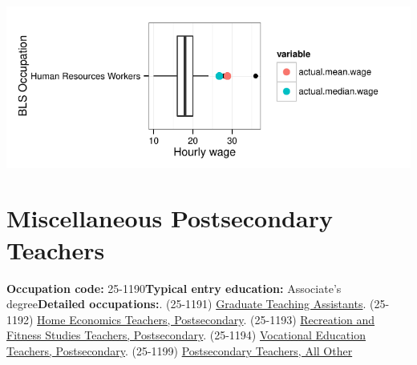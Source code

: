 \documentclass[a4paper,10pt]{article}\usepackage[]{graphicx}\usepackage[]{color}
\makeatletter
\def\maxwidth{ %
  \ifdim\Gin@nat@width>\linewidth
    \linewidth
  \else
    \Gin@nat@width
  \fi
}
\makeatother
\begin{document}
{\centering \includegraphics[width=\maxwidth]{figure/unnamed-chunk-272} 

}


\newpage\section{Miscellaneous Postsecondary Teachers}\textbf{Occupation code:} 25-1190\newline\textbf{Typical entry education:} Associate's degree\newline\textbf{Detailed occupations:}. (25-1191)  \href{http://www.bls.gov/oes/current/oes251191.htm}{Graduate Teaching Assistants}. (25-1192)  \href{http://www.bls.gov/oes/current/oes251192.htm}{Home Economics Teachers, Postsecondary}. (25-1193)  \href{http://www.bls.gov/oes/current/oes251193.htm}{Recreation and Fitness Studies Teachers, Postsecondary}. (25-1194)  \href{http://www.bls.gov/oes/current/oes251194.htm}{Vocational Education Teachers, Postsecondary}. (25-1199)  \href{http://www.bls.gov/oes/current/oes251199.htm}{Postsecondary Teachers, All Other}\newline%
\end{document}
